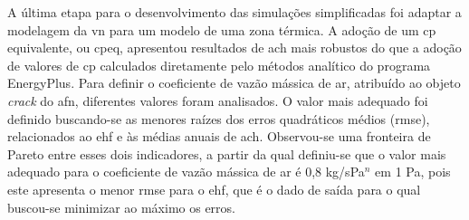 \documentclass[brazil,hardcopy,openany]{ufscthesis} %
\begin{document}
	A última etapa para o desenvolvimento das simulações simplificadas foi adaptar a modelagem da \acrshort{vn} para um modelo de uma zona térmica.
	A adoção de um \acrshort{cp} equivalente, ou \acrshort{cpeq}, apresentou resultados de \acrfull{ach} mais robustos do que a adoção de valores de \acrshort{cp} calculados diretamente pelo métodos analítico do programa EnergyPlus. 
	Para definir o coeficiente de vazão mássica de ar, atribuído ao objeto \textit{crack} do \acrfull{afn}, diferentes valores foram analisados.
	O valor mais adequado foi definido buscando-se as menores raízes dos erros quadráticos médios (\acrshort{rmse}), relacionados ao \acrshort{ehf} e às médias anuais de \acrlong{ach}. 
	Observou-se uma fronteira de Pareto entre esses dois indicadores, a partir da qual definiu-se que o valor mais adequado para o coeficiente de vazão mássica de ar é 0,8 kg/sPa$^n$ em 1 Pa, pois este apresenta o menor \acrshort{rmse} para o \acrshort{ehf}, que é o dado de saída para o qual buscou-se minimizar ao máximo os erros.
	
	
\end{document}
